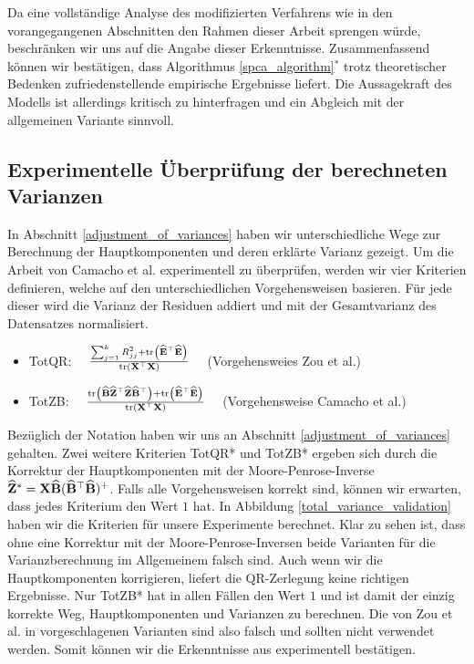 Da eine vollständige Analyse des modifizierten Verfahrens wie in den vorangegangenen Abschnitten den Rahmen dieser Arbeit sprengen würde, beschränken wir uns auf die Angabe dieser Erkenntnisse. Zusammenfassend können wir bestätigen, dass Algorithmus \ref{spca_algorithm}$^*$ trotz theoretischer Bedenken zufriedenstellende empirische Ergebnisse liefert. Die Aussagekraft des Modells ist allerdings kritisch zu hinterfragen und ein Abgleich mit der allgemeinen Variante sinnvoll. 




\subsection{Experimentelle Überprüfung der berechneten Varianzen}

In Abschnitt \ref{adjustment_of_variances} haben wir unterschiedliche Wege zur Berechnung der Hauptkomponenten und deren erklärte Varianz gezeigt. Um die Arbeit von Camacho et al. \cite{camacho} experimentell zu überprüfen, werden wir vier Kriterien definieren, welche auf den unterschiedlichen Vorgehensweisen basieren. Für jede dieser wird die Varianz der Residuen addiert und mit der Gesamtvarianz des Datensatzes normalisiert.
\begin{itemize}
\item TotQR: $\quad \frac{\sum_{j=1}^k R_{jj}^2 + \text{tr} \left( \widehat{\mathbf{E}}^{\top}\widehat{\mathbf{E}} \right)}{\text{tr} \left( \mathbf{X}^{\top}\mathbf{X} \right)} \quad$ (Vorgehensweies Zou et al.)
\item TotZB: $\quad \frac{\text{tr} \left( \widehat{\mathbf{B}} \widehat{\mathbf{Z}}^{\top} \widehat{\mathbf{Z}} \widehat{\mathbf{B}}^{\top} \right) + \text{tr} \left( \widehat{\mathbf{E}}^{\top}\widehat{\mathbf{E}} \right)}{\text{tr} \left( \mathbf{X}^{\top}\mathbf{X} \right)} \quad$ (Vorgehensweise Camacho et al.)
\end{itemize}
Bezüglich der Notation haben wir uns an Abschnitt \ref{adjustment_of_variances} gehalten. Zwei weitere Kriterien TotQR* und TotZB* ergeben sich durch die Korrektur der Hauptkomponenten mit der Moore-Penrose-Inverse $\widehat{\mathbf{Z}}^* = \mathbf{X} \widehat{\mathbf{B}} (\widehat{\mathbf{B}}^{\top}\widehat{\mathbf{B}})^+$. Falls alle Vorgehensweisen korrekt sind, können wir erwarten, dass jedes Kriterium den Wert $1$ hat. In Abbildung \ref{total_variance_validation} haben wir die Kriterien für unsere Experimente berechnet. Klar zu sehen ist, dass ohne eine Korrektur mit der Moore-Penrose-Inversen beide Varianten für die Varianzberechnung im Allgemeinem falsch sind. Auch wenn wir die Hauptkomponenten korrigieren, liefert die QR-Zerlegung keine richtigen Ergebnisse. Nur TotZB* hat in allen Fällen den Wert $1$ und ist damit der einzig korrekte Weg, Hauptkomponenten und Varianzen zu berechnen. Die von Zou et al. in \cite{zou_sparsepca} vorgeschlagenen Varianten sind also falsch und sollten nicht verwendet werden. Somit können wir die Erkenntnisse aus \cite{camacho} experimentell bestätigen.

